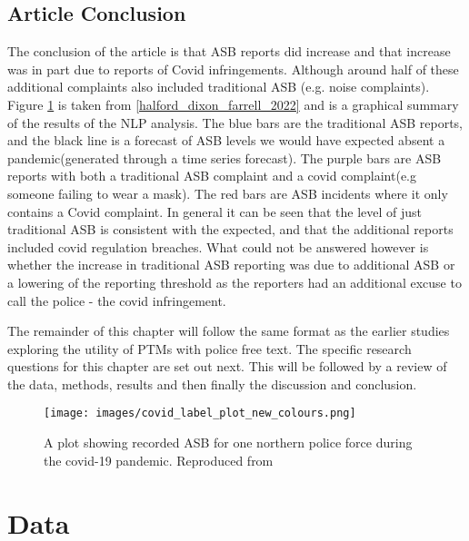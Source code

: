 \subsection{Article Conclusion}
The conclusion of the article is that ASB reports did increase and that increase was in part due to reports of Covid infringements. Although around half of these additional complaints also included traditional ASB (e.g. noise complaints). Figure \ref{fig:ASB}  is taken from \ref{halford_dixon_farrell_2022} and is a graphical summary of the results of the NLP analysis. The blue bars are the traditional ASB reports, and the black line is a forecast of ASB levels we would have expected absent a pandemic(generated through a time series forecast). The purple bars are ASB reports with both a traditional ASB complaint and a covid complaint(e.g someone failing to wear a mask). The red bars are ASB incidents where it only contains a Covid complaint. In general it can be seen that the level of just traditional ASB is consistent with the expected, and that the additional reports included covid regulation breaches. What could not be answered however is whether the increase in traditional ASB reporting was due to additional ASB or a lowering of the reporting threshold as the reporters had an additional excuse to call the police - the covid infringement.

The remainder of this chapter will follow the same format as the earlier studies exploring the utility of PTMs with police free text. The specific research questions for this chapter are set out next. This will be followed by a review of the data, methods, results and then finally the discussion and conclusion.


\begin{figure}
  \texttt{[image: images/covid\_label\_plot\_new\_colours.png]}
  \caption[ASB in the Pandemic]{A plot showing recorded ASB for one northern police force during the covid-19 pandemic.  Reproduced from  \textcite{halford_dixon_farrell_2022} }
  \label{fig:ASB}
\end{figure}






\section{Data}

